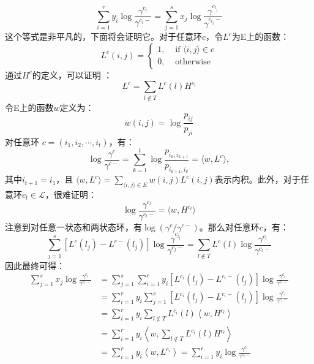 \begin{equation} \label{constraint}
    \sum_{i=1}^{r} y_{i} \log \frac{\gamma^{c_{i}}}{\gamma^{c_{i}-}}=\sum_{j=1}^{s} x_{j} \log \frac{\gamma^{c_{l_{j}}}}{\gamma^{c_{l_{j}}-}}
\end{equation}
这个等式是非平凡的，下面将会证明它。对于任意环$c$，令$L^c$为E上的函数：
\begin{equation*}
    L^{c}(i, j)= \begin{cases}1, & \text { if }\langle i, j\rangle \in c \\ 0, & \text { otherwise }\end{cases}
\end{equation*}
通过$H^c$的定义，可以证明 \cite{kalpazidou2007cycle}：
\begin{equation*}
    L^c = \sum_{l \notin T} L^c(l) H^{c_l}
\end{equation*}
令E上的函数$w$定义为：
\begin{equation*}
    w(i, j) = \log \frac{p_{ij}}{p_{ji}}
\end{equation*}
对任意环 $c=(i_1, i_2, \cdots, i_t)$，有：
\begin{equation*}
    \log \frac{\gamma^{c}}{\gamma^{c-}} = \sum^t_{k=1} \log \frac{p_{i_k, i_{k+1}}}{p_{i_{k+1}, i_k}} = \langle w, L^c \rangle,
\end{equation*}
其中$i_{t+1} = i_1$，且 $\langle w, L^c \rangle = \sum_{\langle i, j \rangle \in E} w(i,j) L^c(i,j)$表示内积。此外，对于任意环$c_l \in \mathcal{L}$，很难证明：
\begin{equation*}
    \log \frac{\gamma^{c_l}}{\gamma^{c_l -}} = \langle w, H^{c_l} \rangle
\end{equation*}
注意到对任意一状态和两状态环，有$\log (\gamma^c / \gamma^{c-})$。那么对任意环$c$，有：
\begin{equation*}
    \sum_{j=1}^{s}\left[L^{c}\left(l_{j}\right)-L^{c-}\left(l_{j}\right)\right] \log \frac{\gamma^{c_{l_{j}}}}{\gamma^{c_{j}-}}=\sum_{l \notin T} L^{c}(l) \log \frac{\gamma^{c_{l}}}{\gamma^{c_{l}-}}
\end{equation*}
因此最终可得：
\begin{equation*}
    \begin{aligned}
    \sum_{j=1}^{s} x_{j} \log \frac{\gamma^{c_{i}}}{\gamma^{c_{i}-}} &=\sum_{j=1}^{s} \sum_{i=1}^{r} y_{i}\left[L^{c_{i}}\left(l_{j}\right)-L^{c_{i}-}\left(l_{j}\right)\right] \log \frac{\gamma^{c_{i}}}{\gamma^{c_{i}-}} \\
    &=\sum_{i=1}^{r} y_{i} \sum_{j=1}^{s}\left[L^{c_{i}}\left(l_{j}\right)-L^{c_{i}-}\left(l_{j}\right)\right] \log \frac{\gamma^{c_{i}}}{\gamma^{c_{i}-}} \\
    &=\sum_{i=1}^{r} y_{i} \sum_{l \notin T} L^{c_{i}}(l)\left\langle w, H^{c_{l}}\right\rangle \\
    &=\sum_{i=1}^{r} y_{i}\left\langle w, \sum_{l \notin T} L^{c_{i}}(l) H^{c_{l}}\right\rangle \\
    &=\sum_{i=1}^{r} y_{i}\left\langle w, L^{c_{i}}\right\rangle=\sum_{i=1}^{r} y_{i} \log \frac{\gamma^{c_{i}}}{\gamma^{c_{i}-}}
    \end{aligned}
\end{equation*}
